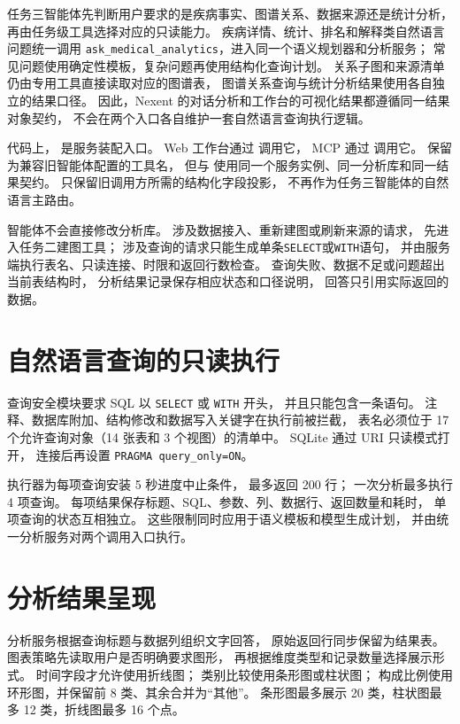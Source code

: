 任务三智能体先判断用户要求的是疾病事实、图谱关系、数据来源还是统计分析，
再由任务级工具选择对应的只读能力。
疾病详情、统计、排名和解释类自然语言问题统一调用
\texttt{ask\_medical\_analytics}，进入同一个语义规划器和分析服务；
常见问题使用确定性模板，复杂问题再使用结构化查询计划。
关系子图和来源清单仍由专用工具直接读取对应的图谱表，
图谱关系查询与统计分析结果使用各自独立的结果口径。
因此，Nexent 的对话分析和工作台的可视化结果都遵循同一结果对象契约，
不会在两个入口各自维护一套自然语言查询执行逻辑。

代码上， 是服务装配入口。
Web 工作台通过  调用它，
MCP 通过  调用它。
 保留为兼容旧智能体配置的工具名，
但与  使用同一个服务实例、同一分析库和同一结果契约。
 只保留旧调用方所需的结构化字段投影，
不再作为任务三智能体的自然语言主路由。

智能体不会直接修改分析库。
涉及数据接入、重新建图或刷新来源的请求，
先进入任务二建图工具；
涉及查询的请求只能生成单条\texttt{SELECT}或\texttt{WITH}语句，
并由服务端执行表名、只读连接、时限和返回行数检查。
查询失败、数据不足或问题超出当前表结构时，
分析结果记录保存相应状态和口径说明，
回答只引用实际返回的数据。

\section{自然语言查询的只读执行}

查询安全模块要求 SQL 以 \texttt{SELECT} 或 \texttt{WITH} 开头，
并且只能包含一条语句。
注释、数据库附加、结构修改和数据写入关键字在执行前被拦截，
表名必须位于 17 个允许查询对象（14 张表和 3 个视图）的清单中。
SQLite 通过 URI 只读模式打开，
连接后再设置 \texttt{PRAGMA query\_only=ON}。

执行器为每项查询安装 5 秒进度中止条件，
最多返回 200 行；
一次分析最多执行 4 项查询。
每项结果保存标题、SQL、参数、列、数据行、返回数量和耗时，
单项查询的状态互相独立。
这些限制同时应用于语义模板和模型生成计划，
并由统一分析服务对两个调用入口执行。

\section{分析结果呈现}

分析服务根据查询标题与数据列组织文字回答，
原始返回行同步保留为结果表。
图表策略先读取用户是否明确要求图形，
再根据维度类型和记录数量选择展示形式。
时间字段才允许使用折线图；
类别比较使用条形图或柱状图；
构成比例使用环形图，并保留前 8 类、其余合并为“其他”。
条形图最多展示 20 类，柱状图最多 12 类，折线图最多 16 个点。

